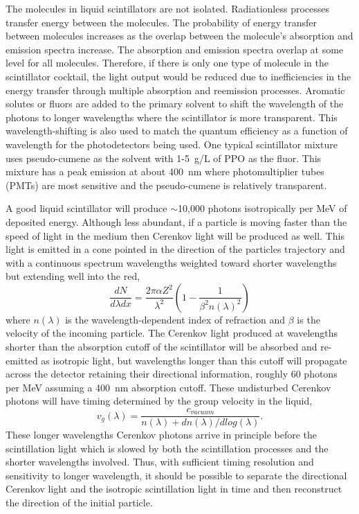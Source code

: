 \documentclass[aps,prc,twocolumn,groupedaddress,showpacs,amsmath,amssymb,floatfix,superscriptaddress]{revtex4}
\begin{document}
The molecules in liquid scintillators are not isolated. Radiationless processes transfer energy between the molecules. The probability of energy transfer between molecules increases as the overlap between the molecule's absorption and emission spectra increase. The absorption and emission spectra overlap at some level for all molecules. Therefore, if there is only one type of molecule in the scintillator cocktail, the light output would be reduced due to inefficiencies in the energy transfer through multiple absorption and reemission processes. Aromatic solutes or fluors are added to the primary solvent to shift the wavelength of the photons to longer wavelengths where the scintillator is more transparent. This wavelength-shifting is also used to match the quantum efficiency as a function of wavelength for the photodetectors being used. One typical scintillator mixture uses pseudo-cumene as the solvent with 1-5~g/L of PPO as the fluor. This mixture has a peak emission at about 400~nm where photomultiplier tubes (PMTs) are most sensitive and the pseudo-cumene is relatively transparent.

A good liquid scintillator will produce $\sim$10,000 photons isotropically per MeV of deposited energy. Although less abundant, if a particle is moving faster than the speed of light in the medium then Cerenkov light will be produced as well. This light is emitted in a cone pointed in the direction of the particles trajectory and with a continuous spectrum wavelengths weighted toward shorter wavelengths but extending well into the red,
\begin{equation}
\label{eqCerenkov}
\frac{dN}{d\lambda dx} = \frac{2 \pi \alpha Z^2}{\lambda^2} ( 1 - \frac{1}{\beta^2 n(\lambda)^2} )
\end{equation}
where $n(\lambda)$ is the wavelength-dependent index of refraction and $\beta$ is the velocity of the incoming particle. The Cerenkov light produced at wavelengths shorter than the absorption cutoff of the scintillator will be absorbed and re-emitted as isotropic light, but wavelengths longer than this cutoff will propagate across the detector retaining their directional information, roughly 60 photons per MeV assuming a 400~nm absorption cutoff\cite{qdot}. These undisturbed Cerenkov photons will have timing determined by the group velocity in the liquid,
\begin{equation}
\label{eqGroup}
v_{g}(\lambda) = \frac{c_{vacuum}}{n(\lambda) + dn(\lambda)/dlog(\lambda)}.
\end{equation}
These longer wavelengths Cerenkov photons arrive in principle before the scintillation light which is slowed by both the scintillation processes and the shorter wavelengths involved. Thus, with sufficient timing resolution and sensitivity to longer wavelength, it should be possible to separate the directional Cerenkov light and the isotropic scintillation light in time and then reconstruct the direction of the initial particle.
\end{document}
